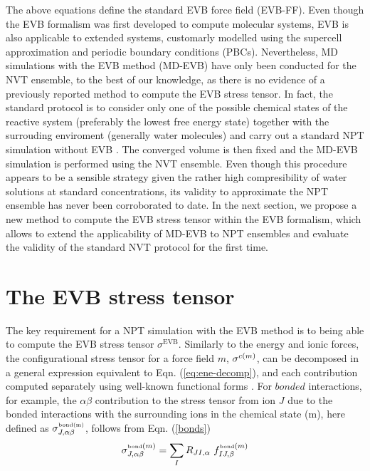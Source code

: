 The above equations define the standard EVB force field (EVB-FF). Even though the EVB formalism was first developed to compute molecular systems, EVB is also applicable to extended systems, customarly modelled using the supercell approximation and periodic boundary conditions (PBCs). Nevertheless, MD simulations with the EVB method (MD-EVB) have only been conducted for the NVT ensemble, to the best of our knowledge, as there is no evidence of a previously reported method to compute the EVB stress tensor. In fact, the standard protocol is to consider only one of the possible chemical states of the reactive system (preferably the lowest free energy state) together with the surrouding enviroment (generally water molecules) and carry out a standard NPT simulation without EVB \cite{kakali2017}. The converged volume is then fixed and the MD-EVB simulation is performed using the NVT ensemble. Even though this procedure appears to be a sensible strategy given the rather high compresibility of water solutions at standard concentrations, its validity to approximate the NPT ensemble has never been corroborated to date. In the next section, we propose a new method to compute the EVB stress tensor within the EVB formalism, which allows to extend the applicability of MD-EVB to NPT ensembles and evaluate the validity of the standard NVT protocol for the first time.

\section{The EVB stress tensor}\label{sec:evb-stress}
The key requirement for a NPT simulation with the EVB method is to being able to compute the EVB stress tensor $\sigma^{\text{EVB}}$.  Similarly to the energy and ionic forces, the configurational stress tensor for a force field $m$, ${\bf \sigma}^{c(m)}$, can be decomposed in a general expression equivalent to Eqn. (\ref{eq:ene-decomp}), and each contribution computed separately using well-known functional forms \cite{smith87-c}. For $bonded$ interactions, for example, the $\alpha\beta$ contribution to the stress tensor from ion $J$ due to the bonded interactions with the surrounding ions in the chemical state (m), here defined as $\sigma_{J,\alpha\beta}^{\text{\tiny{bond}(m)}}$, follows from Eqn. (\ref{bonds})
\begin{equation}\label{eq:stressbond}
\sigma_{J,\alpha\beta}^{\text{\tiny{bond}}(m)}=\sum_{I}{R}_{JI,\alpha}\,\,{f}^{\text{\tiny{bond}}(m)}_{IJ,\beta}
\end{equation}

